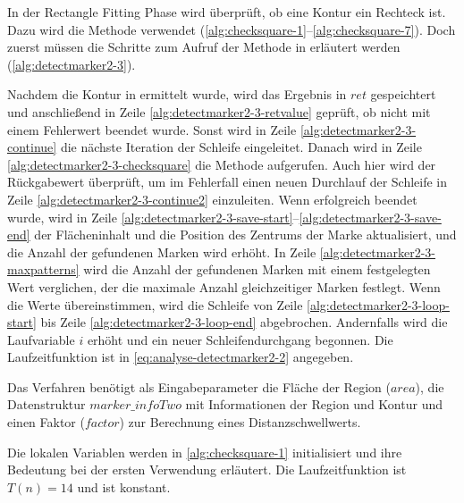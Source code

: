In der Rectangle Fitting Phase wird überprüft, ob eine Kontur ein Rechteck ist. Dazu wird die Methode
  verwendet (\autoref{alg:checksquare-1}--\autoref{alg:checksquare-7}). Doch zuerst müssen die
 Schritte zum Aufruf der Methode in  erläutert werden
 (\autoref{alg:detectmarker2-3}).

Nachdem die Kontur in  ermittelt wurde, wird das Ergebnis in $\mathit{ret}$ gespeichtert und
 anschließend in Zeile \ref{alg:detectmarker2-3-retvalue} geprüft, ob  nicht mit einem
 Fehlerwert beendet wurde. Sonst wird in Zeile \ref{alg:detectmarker2-3-continue} die nächste Iteration der Schleife
 eingeleitet. Danach wird in Zeile \ref{alg:detectmarker2-3-checksquare} die Methode  aufgerufen.
 Auch hier wird der Rückgabewert überprüft, um im Fehlerfall einen neuen Durchlauf der Schleife in Zeile
 \ref{alg:detectmarker2-3-continue2} einzuleiten. Wenn  erfolgreich beendet wurde, wird in Zeile
 \ref{alg:detectmarker2-3-save-start}--\ref{alg:detectmarker2-3-save-end} der Flächeninhalt und die Position des
 Zentrums der Marke aktualisiert, und die Anzahl der gefundenen Marken wird erhöht. In Zeile
 \ref{alg:detectmarker2-3-maxpatterns} wird die Anzahl der gefundenen Marken mit einem festgelegten Wert verglichen, der
 die maximale Anzahl gleichzeitiger Marken festlegt. Wenn die Werte übereinstimmen, wird die Schleife von Zeile
 \ref{alg:detectmarker2-3-loop-start} bis Zeile \ref{alg:detectmarker2-3-loop-end} abgebrochen. Andernfalls wird die
 Laufvariable $i$ erhöht und ein neuer Schleifendurchgang begonnen. Die Laufzeitfunktion ist in
 \autoref{eq:analyse-detectmarker2-2} angegeben.


Das Verfahren  benötigt als Eingabeparameter die Fläche der Region ($\mathit{area}$), die
 Datenstruktur $\mathit{marker\_infoTwo}$ mit Informationen der Region und Kontur und einen Faktor ($\mathit{factor}$)
 zur Berechnung eines Distanzschwellwerts.

Die lokalen Variablen werden in \autoref{alg:checksquare-1} initialisiert und ihre Bedeutung bei der ersten Verwendung erläutert. Die Laufzeitfunktion ist $T(n) = 14$ und ist konstant.

